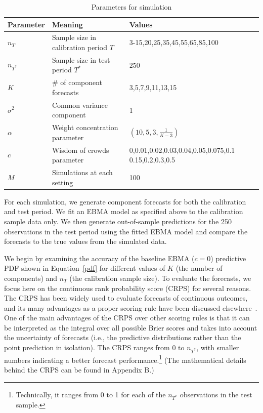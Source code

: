 \documentclass[12pt,fullpage,endnotes]{article}
\begin{document}
\begin{table}
  \caption{Parameters for simulation}
\label{params}
\small
\centering

\vspace{.2cm}
\begin{tabular}{lll}
  \toprule
  Parameter & Meaning & Values \\
  \midrule
  $n_{T}$ & Sample size in calibration period $T$  & 3-15,20,25,35,45,55,65,85,100 \\
  $n_{T^\ast}$ &  Sample size in test period $T^\ast$&$250$\\
  $K$ & \# of component forecasts & 3,5,7,9,11,13,15\\
  $\sigma^2$ & Common variance component & 1 \\
  $\alpha$ & Weight concentration parameter  &$ (10, 5, 3, \frac{1}{K-3})$ \\
 $c$ & Wisdom of crowds parameter & 0,0.01,0.02,0.03,0.04,0.05,0.075,0.1 0.15,0.2,0.3,0.5\\
  $M$ & Simulations at each setting & 100 \\
  \bottomrule
\end{tabular}
\end{table}

For each simulation, we generate component forecasts for both the
calibration and test period. We fit an EBMA model as specified above
to the calibration sample data only. We then generate out-of-sample
predictions for the 250 observations in the test period using the
fitted EBMA model and compare the forecasts to the true values from the
simulated data.  

We begin by examining the accuracy of the baseline EBMA ($c=0$)
predictive PDF shown in Equation~\eqref{pdf} for different values of $K$
(the number of components) and $n_{T}$ (the calibration sample size).
To evaluate the forecasts, we focus here on the continuous rank
probability score (CRPS) for several reasons. The CRPS has been widely
used to evaluate forecasts of continuous outcomes, and its many
advantages as a proper scoring rule have been discussed
elsewhere~\citep{Hersbach:2000,Gneiting_Raftery_2007,GneitingEtAl:2007,brandt:freeman:schrodt:2011}. One
of the main advantages of the CRPS over other scoring rules is that it
can be interpreted as the integral over all possible Brier scores
\citep{Brier:1950} and takes into account the uncertainty of forecasts
(i.e., the predictive distributions rather than the point prediction
in isolation). The CRPS ranges from $0$ to $n_{T^\ast}$, with smaller
numbers indicating a better forecast
performance.\footnote{Technically, it ranges from 0 to 1 for each of
  the $n_{T^\ast}$ observations in the test sample.  } (The
mathematical details behind the CRPS can be found in Appendix B.)
\end{document}
